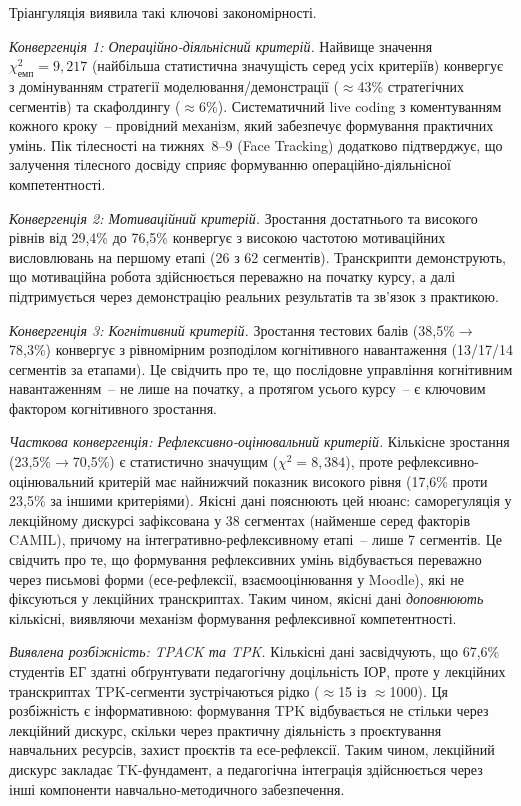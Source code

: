 Тріангуляція виявила такі ключові закономірності.

\textit{Конвергенція 1: Операційно-діяльнісний критерій.} Найвище значення $\chi^2_{\text{емп}} = 9{,}217$ (найбільша статистична значущість серед усіх критеріїв) конвергує з домінуванням стратегії моделювання/демонстрації ($\approx$43\% стратегічних сегментів) та скафолдингу ($\approx$6\%). Систематичний live coding з коментуванням кожного кроку~-- провідний механізм, який забезпечує формування практичних умінь. Пік тілесності на тижнях~8--9 (Face Tracking) додатково підтверджує, що залучення тілесного досвіду сприяє формуванню операційно-діяльнісної компетентності.

\textit{Конвергенція 2: Мотиваційний критерій.} Зростання достатнього та високого рівнів від 29,4\% до 76,5\% конвергує з високою частотою мотиваційних висловлювань на першому етапі (26 з 62 сегментів). Транскрипти демонструють, що мотиваційна робота здійснюється переважно на початку курсу, а далі підтримується через демонстрацію реальних результатів та зв'язок з практикою.

\textit{Конвергенція 3: Когнітивний критерій.} Зростання тестових балів (38,5\%$\to$78,3\%) конвергує з рівномірним розподілом когнітивного навантаження (13/17/14 сегментів за етапами). Це свідчить про те, що послідовне управління когнітивним навантаженням~-- не лише на початку, а протягом усього курсу~-- є ключовим фактором когнітивного зростання.

\textit{Часткова конвергенція: Рефлексивно-оцінювальний критерій.} Кількісне зростання (23,5\%$\to$70,5\%) є статистично значущим ($\chi^2 = 8{,}384$), проте рефлексивно-оцінювальний критерій має найнижчий показник високого рівня (17,6\% проти 23,5\% за іншими критеріями). Якісні дані пояснюють цей нюанс: саморегуляція у лекційному дискурсі зафіксована у 38 сегментах (найменше серед факторів CAMIL), причому на інтегративно-рефлексивному етапі~-- лише 7 сегментів. Це свідчить про те, що формування рефлексивних умінь відбувається переважно через письмові форми (есе-рефлексії, взаємооцінювання у Moodle), які не фіксуються у лекційних транскриптах. Таким чином, якісні дані \textit{доповнюють} кількісні, виявляючи механізм формування рефлексивної компетентності.

\textit{Виявлена розбіжність: TPACK та TPK.} Кількісні дані засвідчують, що 67,6\% студентів ЕГ здатні обґрунтувати педагогічну доцільність ІОР, проте у лекційних транскриптах TPK-сегменти зустрічаються рідко ($\approx$15 із $\approx$1000). Ця розбіжність є інформативною: формування TPK відбувається не стільки через лекційний дискурс, скільки через практичну діяльність з проєктування навчальних ресурсів, захист проєктів та есе-рефлексії. Таким чином, лекційний дискурс закладає TK-фундамент, а педагогічна інтеграція здійснюється через інші компоненти навчально-методичного забезпечення.

